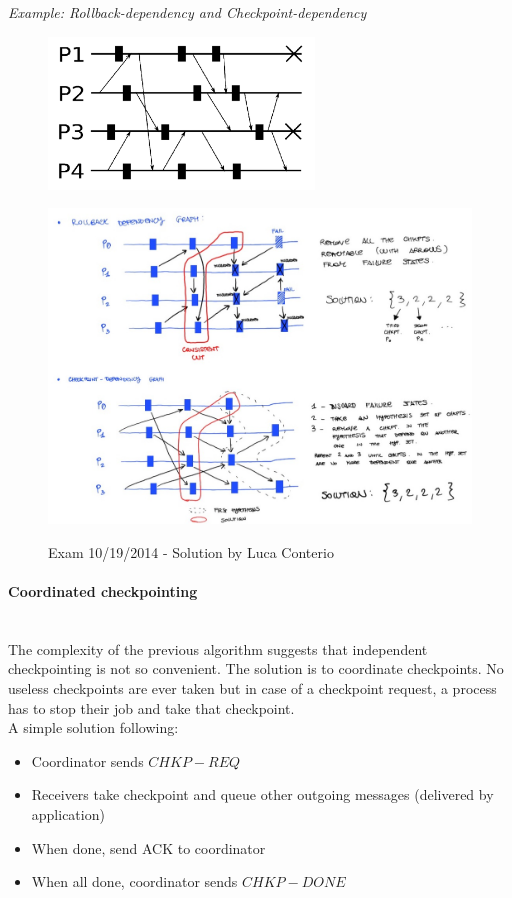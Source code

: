 \documentclass[10pt,a4paper]{article}
\newcommand{\myparagraph}[1]{\paragraph{#1}\mbox{}\\[0.05in]}
\begin{document}
\textit{Example: Rollback-dependency and Checkpoint-dependency}
\begin{figure}[h!]
\hfill \includegraphics[width=200pt]{images/exam-checkpoint.png}\hspace*{\fill}
  \label{fig:exam-checkpoint}
\end{figure}
\begin{figure}[h!]
\hfill \includegraphics[width=350pt]{images/checkpoint-ex.jpeg}\hspace*{\fill}
  \label{fig:checkpoint-ex}
  \caption{Exam 10/19/2014 - Solution by Luca Conterio}
\end{figure}
\myparagraph{Coordinated checkpointing}
The complexity of the previous algorithm suggests that independent checkpointing is not so convenient. The solution is to coordinate checkpoints. No useless checkpoints are ever taken but in case of a checkpoint request, a process has to stop their job and take that checkpoint. \\ A simple solution following:
\begin{itemize}
	\item Coordinator sends $CHKP-REQ$
	\item Receivers take checkpoint and queue other outgoing messages (delivered by application)
	\item When done, send ACK to coordinator
	\item When all done, coordinator sends $CHKP-DONE$
\end{itemize}
\end{document}
